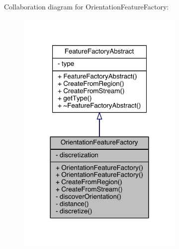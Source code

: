 Collaboration diagram for Orientation\+Feature\+Factory\+:\nopagebreak
\begin{figure}[H]
\begin{center}
\leavevmode
\includegraphics[width=228pt]{class_orientation_feature_factory__coll__graph}
\end{center}
\end{figure}


